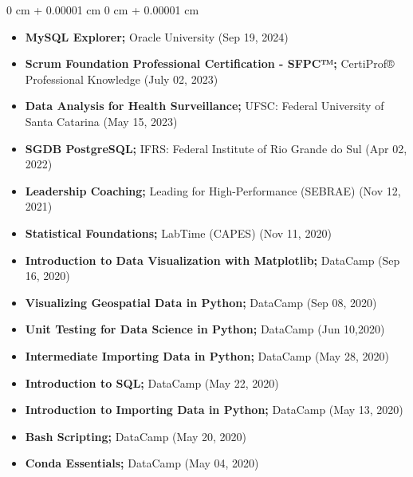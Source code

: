 \documentclass[10pt, letterpaper]{article}
\newenvironment{highlights}{
    \begin{itemize}[
        topsep=0.10 cm,
        parsep=0.10 cm,
        partopsep=0pt,
        itemsep=0pt,
        leftmargin=0 cm + 10pt
    ]
}{
    \end{itemize}
} %
\newenvironment{onecolentry}{
    \begin{adjustwidth}{
        0 cm + 0.00001 cm
    }{
        0 cm + 0.00001 cm
    }
}{
    \end{adjustwidth}
} %
\begin{document}
        \begin{onecolentry}
            \begin{highlights}
   
        \item{\textbf{MySQL Explorer;} Oracle University (Sep 19, 2024)}
    
        \item{\textbf{Scrum Foundation Professional Certification - SFPC™;} CertiProf® Professional Knowledge (July 02, 2023)}
        
        \item{\textbf{Data Analysis for Health Surveillance;} UFSC: Federal University of Santa Catarina (May 15, 2023)}
    
        \item{\textbf{SGDB PostgreSQL;} IFRS: Federal Institute of Rio Grande do Sul (Apr 02, 2022)}
    
        \item{\textbf{Leadership Coaching;} Leading for High-Performance (SEBRAE) (Nov 12, 2021)}
        
        \item{\textbf{Statistical Foundations;} LabTime (CAPES) (Nov 11, 2020)}
        
        \item{\textbf{Introduction to Data Visualization with Matplotlib;} {DataCamp} (Sep 16, 2020)}
        
        \item{\textbf{Visualizing Geospatial Data in Python;} {DataCamp} (Sep 08, 2020)}
        
        \item{\textbf{Unit Testing for Data Science in Python;} {DataCamp} (Jun 10,2020)}
        
        \item{\textbf{Intermediate Importing Data in Python;} {DataCamp} (May 28, 2020)}
        
        \item{\textbf{Introduction to SQL;} {DataCamp} (May 22, 2020)}
        
        \item{\textbf{Introduction to Importing Data in Python;} {DataCamp} (May 13, 2020)}
        
        \item{\textbf{Bash Scripting;} {DataCamp} (May 20, 2020)}
        
        \item{\textbf{Conda Essentials;} {DataCamp} (May 04, 2020)}
        

\end{highlights}
\end{onecolentry}
\end{document}
